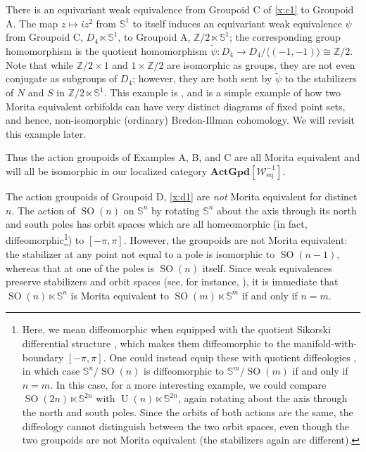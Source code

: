 \documentclass[12pt,reqno]{amsart}
\newcommand{\printname}[1]{}
\renewcommand{\printname}[1]
	{{\color{brown}{\makebox[0pt]{\hspace{-1in}\raisebox{8pt}{\tiny #1}}}}}
\newcommand{\labell}[1]{\label{#1} \printname{#1}}
\newcommand{\calW}{{\mathcal{W}}}
\renewcommand{\SS}{{\mathbb{S}}} %
\newcommand{\ZZ}{{\mathbb{Z}}}  %
\newcommand{\SO}{{\operatorname{SO}}}  %
\newcommand{\U}{{\operatorname{U}}}  %
\theoremstyle{plain}
\theoremstyle{definition}
\newenvironment{example}
		{\pushQED{\qed}\renewcommand{\qedsymbol}{$/\!\!/$}\examplex}
		{\popQED\endexamplex}
\newcommand{\ActGpd}{{\mathbf{ActGpd}}} %
\newcommand{\eq}{{\operatorname{eq}}} %
\begin{document}
    \begin{example} \labell{x:ac}
        There is an equivariant weak equivalence from Groupoid C of \cref{x:c1} to Groupoid A.   The map $z\mapsto iz^2$ from $\SS^1$ to itself induces an equivariant weak equivalence $\psi$ from Groupoid C, $D_4\ltimes\SS^1$, to Groupoid A, $\ZZ/2\ltimes\SS^1$; the corresponding group homomorphism is the quotient homomorphism $\widetilde{\psi}\colon D_4\to D_4/\langle (-1,-1)\rangle\cong\ZZ/2$.  Note that while $\ZZ/2\times 1$ and $1\times\ZZ/2$ are isomorphic as groups, they are not even conjugate as subgroups of $D_4$; however, they are both sent by $\widetilde{\psi}$ to the stabilizers of $N$ and $S$ in $\ZZ/2\ltimes\SS^1$.  This example is \cite[Example 5.3]{PS:translation}, and is a simple example of how two Morita equivalent orbifolds can have very distinct diagrams of fixed point sets, and hence, non-isomorphic (ordinary) Bredon-Illman cohomology.    We will revisit this example later. 
    \end{example}


Thus the action groupoids of Examples A, B, and C are all Morita equivalent and will all be isomorphic in our localized category $\ActGpd[\calW^{-1}_{\eq}]$.  

    \begin{example}\labell{x:d2}  The action groupoids of Groupoid D,  \cref{x:d1} are \emph{not} Morita equivalent for distinct $n$. 
       The action of  $\SO(n)$ on $\SS^n$ by rotating $\SS^n$ about the axis through its north and south poles has   orbit spaces which are all homeomorphic (in fact, diffeomorphic\footnote{Here, we mean diffeomorphic when equipped with the quotient Sikorski differential structure \cite{sniatycki}, which makes them diffeomorphic to the manifold-with-boundary $[-\pi,\pi]$.  One could instead equip these with quotient diffeologies \cite{iglesias}, in which case $\SS^n/\SO(n)$ is diffeomorphic to $\SS^m/\SO(m)$ if and only if $n=m$.  In this case, for a more interesting example, we could compare $\SO(2n)\ltimes\SS^{2n}$ with $\U(n)\ltimes\SS^{2n}$, again rotating about the axis through the north and south poles.  Since the orbits of both actions are the same, the diffeology cannot distinguish between the two orbit spaces, even though the two groupoids are not Morita equivalent (the stabilizers again are different).}) to $[-\pi,\pi]$.  However, the groupoids are not Morita equivalent: the stabilizer at any point not equal to a pole is isomorphic to $\SO(n-1)$, whereas that at one of the poles is $\SO(n)$ itself.  Since weak equivalences preserve stabilizers and orbit spaces (see, for instance, \cite[Theorem 4.3.1]{dH:orbispaces}), it is immediate that $\SO(n)\ltimes\SS^n$ is Morita equivalent to $\SO(m)\ltimes\SS^m$ if and only if $n=m$.
    \end{example}
\end{document}
